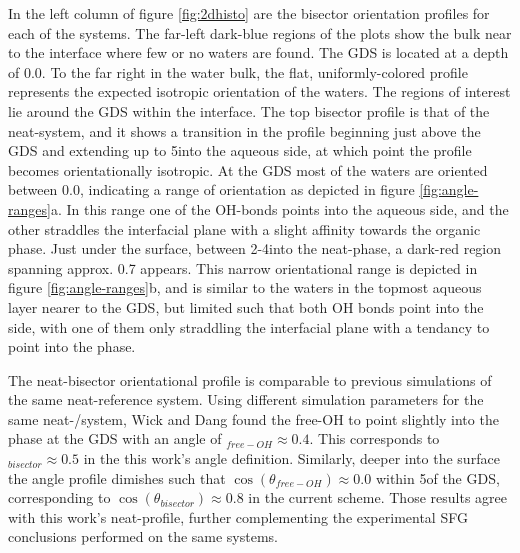 In the left column of figure \ref{fig:2dhisto} are the bisector orientation profiles for each of the systems. The far-left dark-blue regions of the plots show the \ctc bulk near to the interface where few or no waters are found. The GDS is located at a depth of 0.0\angs. To the far right in the water bulk, the flat, uniformly-colored profile represents the expected isotropic orientation of the waters. The regions of interest lie around the GDS within the interface. The top bisector profile is that of the neat-\wat system, and it shows a transition in the profile beginning just above the GDS and extending up to 5\angs into the aqueous side, at which point the profile becomes orientationally isotropic. At the GDS most of the waters are oriented between 0.0, indicating a range of orientation as depicted in figure \ref{fig:angle-ranges}a. In this range one of the OH-bonds points into the aqueous side, and the other straddles the interfacial plane with a slight affinity towards the organic \ctc phase. Just under the surface, between 2-4\angs into the neat-\wat phase, a dark-red region spanning approx. 0.7 appears. This narrow orientational range is depicted in figure \ref{fig:angle-ranges}b, and is similar to the waters in the topmost aqueous layer nearer to the GDS, but limited such that both OH bonds point into the \wat side, with one of them only straddling the interfacial plane with a tendancy to point into the \wat phase.

The neat-\wat bisector orientational profile is comparable to previous simulations of the same neat-\wat reference system. Using different simulation parameters for the same neat-\wat/\ctc system, Wick and Dang found the free-OH to point slightly into the \ctc phase at the GDS with an angle of \costheta$_{free-OH}\approx 0.4$. This corresponds to \costheta$_{bisector} \approx 0.5$ in the this work's angle definition. Similarly, deeper into the surface the angle profile dimishes such that $\cos(\theta_{free-OH})\approx 0.0$ within 5\angs of the GDS, corresponding to $\cos(\theta_{bisector})\approx 0.8$ in the current scheme. Those results agree with this work's neat-\wat profile, further complementing the experimental SFG conclusions performed on the same systems.\cite{McFearin2009,Scatena2001}


